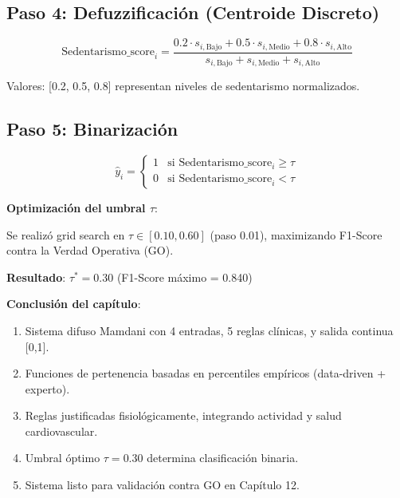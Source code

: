 \documentclass[12pt,letterpaper,twoside]{report}
\begin{document}
\begin{calculobox}
\subsection{Paso 4: Defuzzificación (Centroide Discreto)}

\begin{equation}
\text{Sedentarismo\_score}_i = \frac{0.2 \cdot s_{i,\text{Bajo}} + 0.5 \cdot s_{i,\text{Medio}} + 0.8 \cdot s_{i,\text{Alto}}}{s_{i,\text{Bajo}} + s_{i,\text{Medio}} + s_{i,\text{Alto}}}
\end{equation}

Valores: [0.2, 0.5, 0.8] representan niveles de sedentarismo normalizados.

\subsection{Paso 5: Binarización}

\begin{equation}
\hat{y}_i = 
\begin{cases}
1 & \text{si } \text{Sedentarismo\_score}_i \geq \tau \\
0 & \text{si } \text{Sedentarismo\_score}_i < \tau
\end{cases}
\end{equation}

\begin{decisionbox}
\textbf{Optimización del umbral $\tau$}:

Se realizó grid search en $\tau \in [0.10, 0.60]$ (paso 0.01), maximizando F1-Score contra la Verdad Operativa (GO).

\textbf{Resultado}: $\tau^* = 0.30$ (F1-Score máximo = 0.840)
\end{decisionbox}

\begin{conclusionbox}
\textbf{Conclusión del capítulo}:

\begin{enumerate}[noitemsep]
    \item Sistema difuso Mamdani con 4 entradas, 5 reglas clínicas, y salida continua [0,1].
    \item Funciones de pertenencia basadas en percentiles empíricos (data-driven + experto).
    \item Reglas justificadas fisiológicamente, integrando actividad y salud cardiovascular.
    \item Umbral óptimo $\tau=0.30$ determina clasificación binaria.
    \item Sistema listo para validación contra GO en Capítulo 12.
\end{enumerate}
\end{conclusionbox}


\end{calculobox}
\end{document}

